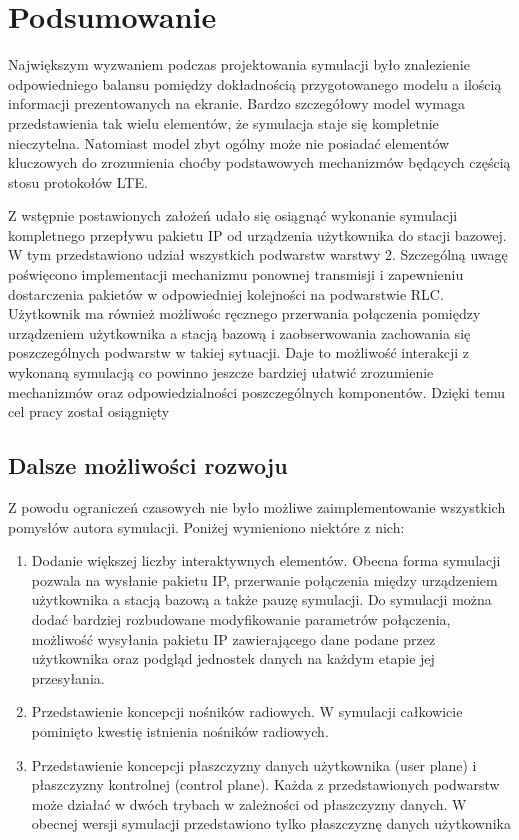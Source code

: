 \chapter{Podsumowanie}
\label{cha:podsumowanie}

Największym wyzwaniem podczas projektowania symulacji było znalezienie odpowiedniego balansu pomiędzy dokładnością przygotowanego modelu a ilością informacji prezentowanych na ekranie. Bardzo szczegółowy model wymaga przedstawienia tak wielu elementów, że symulacja staje się kompletnie nieczytelna. Natomiast model zbyt ogólny może nie posiadać elementów kluczowych do zrozumienia choćby podstawowych mechanizmów będących częścią stosu protokołów LTE.

Z wstępnie postawionych założeń udało się osiągnąć wykonanie symulacji kompletnego przepływu pakietu IP od urządzenia użytkownika do stacji bazowej. W tym przedstawiono udział wszystkich podwarstw warstwy 2. Szczególną uwagę poświęcono implementacji mechanizmu ponownej transmisji i zapewnieniu dostarczenia pakietów w odpowiedniej kolejności na podwarstwie RLC. Użytkownik ma również możliwośc ręcznego przerwania połączenia pomiędzy urządzeniem użytkownika a stacją bazową i zaobserwowania zachowania się poszczególnych podwarstw w takiej sytuacji. Daje to możliwość interakcji z wykonaną symulacją co powinno jeszcze bardziej ułatwić zrozumienie mechanizmów oraz odpowiedzialności poszczególnych komponentów. Dzięki temu cel pracy został osiągnięty

\section{Dalsze możliwości rozwoju}

Z powodu ograniczeń czasowych nie było możliwe zaimplementowanie wszystkich pomysłów autora symulacji. Poniżej wymieniono niektóre z nich:

\begin{enumerate}
	\item Dodanie większej liczby interaktywnych elementów. Obecna forma symulacji pozwala na wysłanie pakietu IP, przerwanie połączenia między urządzeniem użytkownika a stacją bazową a także pauzę symulacji. Do symulacji można dodać bardziej rozbudowane modyfikowanie parametrów połączenia, możliwość wysyłania pakietu IP zawierającego dane podane przez użytkownika oraz podgląd jednostek danych na każdym etapie jej przesyłania.
	\item Przedstawienie koncepcji nośników radiowych. W symulacji całkowicie pominięto kwestię istnienia nośników radiowych.
	\item Przedstawienie koncepcji płaszczyzny danych użytkownika (user plane) i płaszczyzny kontrolnej (control plane). Każda z przedstawionych podwarstw może działać w dwóch trybach w zależności od płaszczyzny danych. W obecnej wersji symulacji przedstawiono tylko płaszczyznę danych użytkownika
\end{enumerate}
